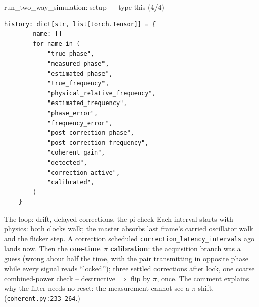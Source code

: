 \documentclass[10pt]{beamer}
\begin{document}
\begin{frame}[fragile]{run\_two\_way\_simulation: setup --- type this (4/4)}
\begin{lstlisting}[basicstyle=\ttfamily\tiny]
    history: dict[str, list[torch.Tensor]] = {
        name: []
        for name in (
            "true_phase",
            "measured_phase",
            "estimated_phase",
            "true_frequency",
            "physical_relative_frequency",
            "estimated_frequency",
            "phase_error",
            "frequency_error",
            "post_correction_phase",
            "post_correction_frequency",
            "coherent_gain",
            "detected",
            "correction_active",
            "calibrated",
        )
    }
\end{lstlisting}
\end{frame}

\begin{frame}{The loop: drift, delayed corrections, the pi check}
  Each interval starts with physics: both clocks walk; the
  master absorbs last frame's carried oscillator walk and the
  flicker step. A correction scheduled
  \texttt{correction\_latency\_intervals} ago lands now. Then
  the \textbf{one-time $\pi$ calibration}: the acquisition
  branch was a guess (wrong about half the time, with the pair
  transmitting in opposite phase while every signal reads
  ``locked''); three settled corrections after lock, one
  coarse combined-power check -- destructive $\Rightarrow$
  flip by $\pi$, once. The comment explains why the filter
  needs no reset: the measurement cannot see a $\pi$ shift.
  (\texttt{coherent.py:233--264}.)
\end{frame}
\end{document}
